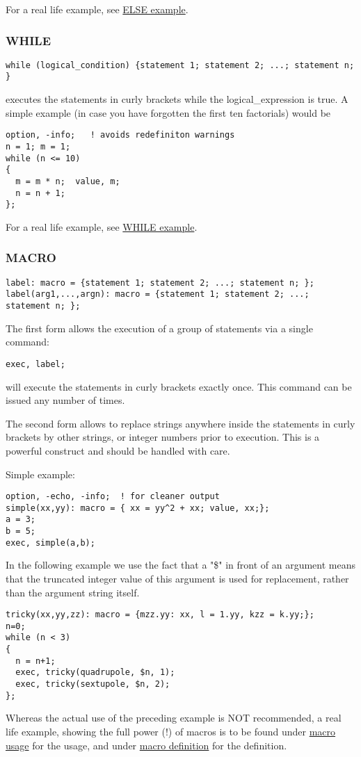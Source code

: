 For a real life example, see \href{foot.html}{ELSE example}. 


\subsubsection{ WHILE }
\begin{verbatim}
while (logical_condition) {statement 1; statement 2; ...; statement n; }
\end{verbatim}  
executes the statements in curly brackets while the logical\_expression
is true. A simple example (in case you have forgotten the first ten
factorials) would be  
\begin{verbatim}
option, -info;   ! avoids redefiniton warnings
n = 1; m = 1;
while (n <= 10)
{
  m = m * n;  value, m;
  n = n + 1;
};
\end{verbatim}

For a real life example, see \href{foot.html}{WHILE example}.

\subsubsection{ MACRO }

\begin{verbatim}
label: macro = {statement 1; statement 2; ...; statement n; };
label(arg1,...,argn): macro = {statement 1; statement 2; ...; statement n; };
\end{verbatim} 

The first form allows the execution of a group of statements via a
single command:  
\begin{verbatim}
exec, label;
\end{verbatim} 
will execute the statements in curly brackets exactly once. This command
can be issued any number of times.  

The second form allows to replace strings anywhere inside the statements
in curly brackets by other strings, or integer numbers prior to
execution. This is a powerful construct and should be handled with care.  

Simple example: 
\begin{verbatim}
option, -echo, -info;  ! for cleaner output
simple(xx,yy): macro = { xx = yy^2 + xx; value, xx;};
a = 3;
b = 5;
exec, simple(a,b);
\end{verbatim}

In the following example we use the fact that a "\$" in front of an
argument means that the truncated integer value of this argument is used
for replacement, rather than the argument string itself.  
\begin{verbatim}
tricky(xx,yy,zz): macro = {mzz.yy: xx, l = 1.yy, kzz = k.yy;};
n=0;
while (n < 3)
{
  n = n+1;
  exec, tricky(quadrupole, $n, 1);
  exec, tricky(sextupole, $n, 2);
};
\end{verbatim} 
Whereas the actual use of the preceding example is NOT recommended,
a real life example, showing the full power (!) of macros is to be
found under \href{foot.html}{macro usage} for the usage, and
under \href{foot.html#macro}{macro definition} for the
definition.


